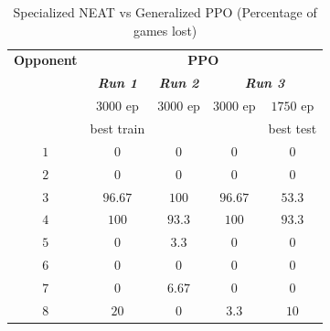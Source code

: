 \documentclass[conference]{IEEEtran}
\begin{document}
    \begin{table}[htbp]
        \caption{Specialized NEAT vs Generalized PPO (Percentage of games lost)}
        \begin{center}
            \begin{tabular}{|c|c|c|c|c|}
                \hline
                \textbf{Opponent}&\multicolumn{4}{|c|}{\textbf{PPO}} \\
                \cline{2-5}
                & \textbf{\textit{Run 1}}& \textbf{\textit{Run 2}}& \multicolumn{2}{|c|}{\textbf{\textit{Run 3}}} \\
                \cline{4-5}
                & $3000$ ep & $3000$ ep & $3000$ ep & $1750$ ep\\
                & best train & & & best test \\
                \hline
                $1$ & $0$     & $0$    & $0$     & $0$   \\
                $2$ & $0$     & $0$    & $0$     & $0$   \\
                $3$ & $96.67$ & $100$  & $96.67$ & $53.3$ \\
                $4$ & $100$   & $93.3$ & $100$   & $93.3$  \\
                $5$ & $0$     & $3.3$  & $0$     & $0$   \\
                $6$ & $0$     & $0$    & $0$     & $0$   \\
                $7$ & $0$     & $6.67$ & $0$     & $0$   \\
                $8$ & $20$    & $0$    & $3.3$   & $10$    \\
                \hline

            \end{tabular}
        \end{center}
    \end{table}
\end{document}
